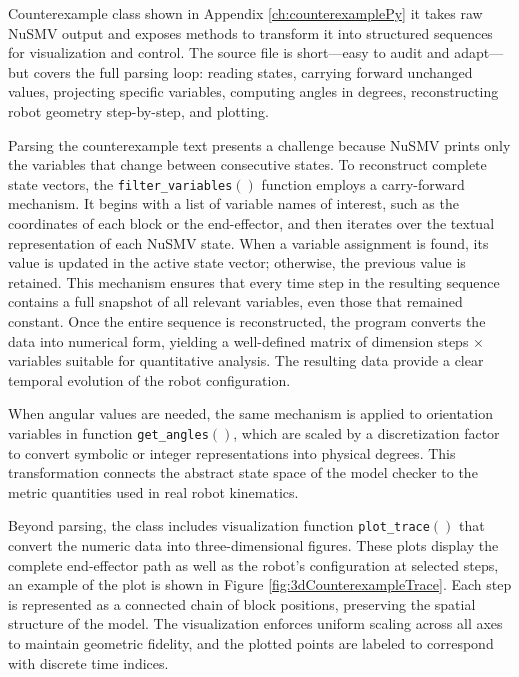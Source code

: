 Counterexample class shown in Appendix \ref{ch:counterexamplePy} 
it takes raw NuSMV output and exposes methods 
to transform it into structured sequences for visualization and control. 
The source file is short—easy to audit and adapt—but covers the full 
parsing loop: reading states, carrying forward unchanged values, projecting 
specific variables, computing angles in degrees, reconstructing robot 
geometry step-by-step, and plotting.

Parsing the counterexample text presents a challenge because NuSMV prints 
only the variables that change between consecutive states. 
To reconstruct complete state vectors, the \texttt{filter\_variables$()$} function
employs a carry-forward mechanism. 
It begins with a list of variable names of interest, such as the coordinates of 
each block or the end-effector, and then iterates over the textual representation 
of each NuSMV state. When a variable assignment is found, its value is 
updated in the active state vector; otherwise, the previous value is 
retained. This mechanism ensures that every time step in the resulting sequence 
contains a full snapshot of all relevant variables, even those that remained 
constant. Once the entire sequence is reconstructed, the program converts 
the data into numerical form, yielding a well-defined matrix of dimension 
steps $\times$ variables suitable for quantitative analysis.
The resulting data provide a clear temporal evolution of the robot configuration.

When angular values are needed, the same mechanism is applied to 
orientation variables in function \texttt{get\_angles$()$}, 
which are scaled by a discretization factor to 
convert symbolic or integer representations into physical degrees. 
This transformation connects the abstract state space of the model checker 
to the metric quantities used in real robot kinematics.

Beyond parsing, the class includes visualization function \texttt{plot\_trace$()$} that convert 
the numeric data into three-dimensional figures. These plots display the 
complete end-effector path as well as the robot’s configuration at 
selected steps, an example of the plot is shown in Figure \ref{fig:3dCounterexampleTrace}.
Each step is represented as a connected chain of block 
positions, preserving the spatial structure of the model. The visualization enforces 
uniform scaling across all axes to maintain geometric fidelity, and 
the plotted points are labeled to correspond with discrete time indices. 

